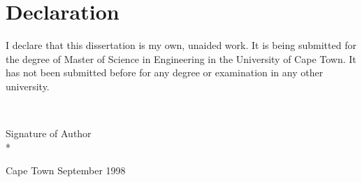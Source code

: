                      

\chapter*{Declaration}


I declare that this dissertation is my own, unaided work. It is being
submitted for the degree of Master of Science in Engineering in the
University of Cape Town. It has not been submitted before for any degree or
examination in any other university.

~\vspace{25mm}

{Signature of Author}\dotfill\null\\*

\vspace{1cm}Cape Town\newline
September 1998
